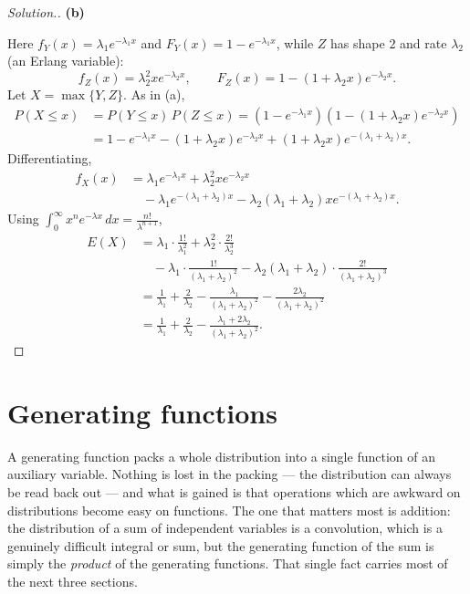 \documentclass[11pt,a4paper]{article}
\theoremstyle{definition}
\newenvironment{solution}
  {\renewcommand{\qedsymbol}{}\begin{proof}[\textit{Solution}.]}
  {\end{proof}}
\newcommand{\subhead}[1]{%
  \par\medskip\noindent\textbf{#1}\par\nobreak\smallskip}
\begin{document}
\begin{solution}
\subhead{(b)}
Here $f_Y(x) = \lambda_1e^{-\lambda_1x}$ and $F_Y(x) = 1-e^{-\lambda_1x}$, while
$Z$ has shape $2$ and rate $\lambda_2$ (an Erlang variable):
$$f_Z(x) = \lambda_2^{2}xe^{-\lambda_2x},\qquad
F_Z(x) = 1-(1+\lambda_2x)e^{-\lambda_2x}.$$
Let $X = \max\{Y,Z\}$. As in (a),
\begin{align*}
P(X\leq x) &= P(Y\leq x)\,P(Z\leq x)
= \left(1-e^{-\lambda_1x}\right)\left(1-(1+\lambda_2x)e^{-\lambda_2x}\right)\\
&= 1-e^{-\lambda_1x}-(1+\lambda_2x)e^{-\lambda_2x}
+(1+\lambda_2x)e^{-(\lambda_1+\lambda_2)x}.
\end{align*}
Differentiating,
\begin{align*}
f_X(x) &= \lambda_1e^{-\lambda_1x}+\lambda_2^{2}xe^{-\lambda_2x}\\
&\quad -\lambda_1e^{-(\lambda_1+\lambda_2)x}
-\lambda_2(\lambda_1+\lambda_2)xe^{-(\lambda_1+\lambda_2)x}.
\end{align*}
Using $\int_0^{\infty}x^{n}e^{-\lambda x}\,dx = \frac{n!}{\lambda^{n+1}}$,
\begin{align*}
E(X) &= \lambda_1\cdot\frac{1!}{\lambda_1^{2}}
+ \lambda_2^{2}\cdot\frac{2!}{\lambda_2^{3}}\\
&\quad - \lambda_1\cdot\frac{1!}{(\lambda_1+\lambda_2)^{2}}
- \lambda_2(\lambda_1+\lambda_2)\cdot\frac{2!}{(\lambda_1+\lambda_2)^{3}}\\
&= \frac{1}{\lambda_1}+\frac{2}{\lambda_2}
-\frac{\lambda_1}{(\lambda_1+\lambda_2)^{2}}
-\frac{2\lambda_2}{(\lambda_1+\lambda_2)^{2}}\\
&= \frac{1}{\lambda_1}+\frac{2}{\lambda_2}
-\frac{\lambda_1+2\lambda_2}{(\lambda_1+\lambda_2)^{2}}.
\end{align*}
\end{solution}


\section{Generating functions}

A generating function packs a whole distribution into a single function of an
auxiliary variable. Nothing is lost in the packing --- the distribution can
always be read back out --- and what is gained is that operations which are
awkward on distributions become easy on functions. The one that matters most is
addition: the distribution of a sum of independent variables is a convolution,
which is a genuinely difficult integral or sum, but the generating function of
the sum is simply the \emph{product} of the generating functions. That single
fact carries most of the next three sections.
\end{document}
